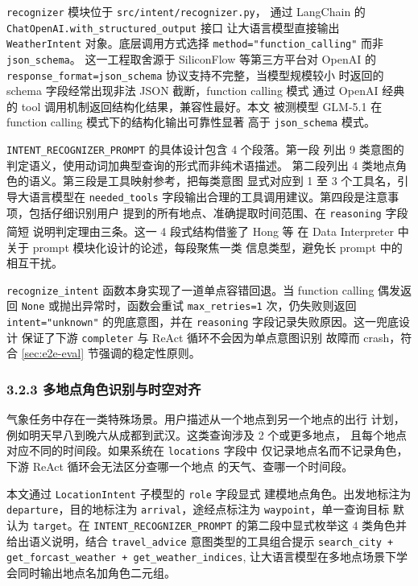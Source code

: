 \documentclass[a4paper]{article}
\theoremstyle{definition}
\theoremstyle{plain}
\theoremstyle{remark}
\let\oldcite\cite
\renewcommand{\cite}[1]{\textsuperscript{\oldcite{#1}}}
\newcommand{\bk}{\discretionary{}{}{}}
\begin{document}
\texttt{recognizer} 模块位于 \texttt{src/\bk{}intent/\bk{}recognizer.\bk{}py}，
通过 LangChain 的 \texttt{ChatOpenAI.\bk{}with\_\bk{}structured\_\bk{}output} 接口
让大语言模型直接输出 \texttt{WeatherIntent} 对象。底层调用方式选择
\texttt{method=\bk{}"function\_\bk{}calling"} 而非 \texttt{json\_\bk{}schema}。
这一工程取舍源于 SiliconFlow 等第三方平台对 OpenAI 的
\texttt{response\_\bk{}format=\bk{}json\_\bk{}schema} 协议支持不完整，当模型规模较小
时返回的 schema 字段经常出现非法 JSON 截断，function calling 模式
通过 OpenAI 经典的 tool 调用机制返回结构化结果，兼容性最好。本文
被测模型 GLM-5.1 在 function calling 模式下的结构化输出可靠性显著
高于 \texttt{json\_\bk{}schema} 模式。

\texttt{INTENT\_\bk{}RECOGNIZER\_\bk{}PROMPT} 的具体设计包含 4 个段落。第一段
列出 9 类意图的判定语义，使用动词加典型查询的形式而非纯术语描述。
第二段列出 4 类地点角色的语义。第三段是工具映射参考，把每类意图
显式对应到 1 至 3 个工具名，引导大语言模型在 \texttt{needed\_\bk{}tools}
字段输出合理的工具调用建议。第四段是注意事项，包括仔细识别用户
提到的所有地点、准确提取时间范围、在 \texttt{reasoning} 字段简短
说明判定理由三条。这一 4 段式结构借鉴了 Hong 等 \cite{ref20} 在
Data Interpreter 中关于 prompt 模块化设计的论述，每段聚焦一类
信息类型，避免长 prompt 中的相互干扰。

\texttt{recognize\_\bk{}intent} 函数本身实现了一道单点容错回退。当
function calling 偶发返回 \texttt{None} 或抛出异常时，函数会重试
\texttt{max\_\bk{}retries=\bk{}1} 次，仍失败则返回 \texttt{intent=\bk{}"unknown"}
的兜底意图，并在 \texttt{reasoning} 字段记录失败原因。这一兜底设计
保证了下游 \texttt{completer} 与 ReAct 循环不会因为单点意图识别
故障而 crash，符合 \ref{sec:e2e-eval} 节强调的稳定性原则。

\subsubsection*{3.2.3 \quad 多地点角色识别与时空对齐}

气象任务中存在一类特殊场景。用户描述从一个地点到另一个地点的出行
计划，例如明天早八到晚六从成都到武汉。这类查询涉及 2 个或更多地点，
且每个地点对应不同的时间段。如果系统在 \texttt{locations} 字段中
仅记录地点名而不记录角色，下游 ReAct 循环会无法区分查哪一个地点
的天气、查哪一个时间段。

本文通过 \texttt{LocationIntent} 子模型的 \texttt{role} 字段显式
建模地点角色。出发地标注为 \texttt{departure}，目的地标注为
\texttt{arrival}，途经点标注为 \texttt{waypoint}，单一查询目标
默认为 \texttt{target}。在 \texttt{INTENT\_\bk{}RECOGNIZER\_\bk{}PROMPT}
的第二段中显式枚举这 4 类角色并给出语义说明，结合
\texttt{travel\_\bk{}advice} 意图类型的工具组合提示
\texttt{search\_\bk{}city + get\_\bk{}forcast\_\bk{}weather + get\_\bk{}weather\_\bk{}indices},
让大语言模型在多地点场景下学会同时输出地点名加角色二元组。
\end{document}
